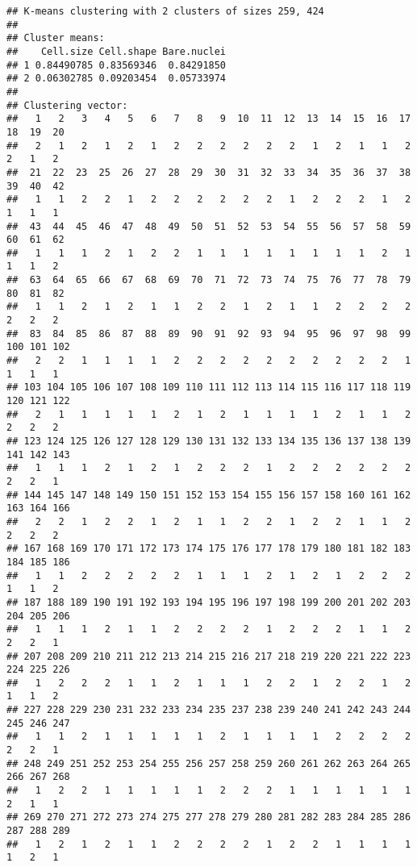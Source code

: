 \documentclass[]{article}
\begin{document}
\begin{verbatim}
## K-means clustering with 2 clusters of sizes 259, 424
## 
## Cluster means:
##    Cell.size Cell.shape Bare.nuclei
## 1 0.84490785 0.83569346  0.84291850
## 2 0.06302785 0.09203454  0.05733974
## 
## Clustering vector:
##   1   2   3   4   5   6   7   8   9  10  11  12  13  14  15  16  17  18  19  20 
##   2   1   2   1   2   1   2   2   2   2   2   2   1   2   1   1   2   2   1   2 
##  21  22  23  25  26  27  28  29  30  31  32  33  34  35  36  37  38  39  40  42 
##   1   1   2   2   1   2   2   2   2   2   2   1   2   2   2   1   2   1   1   1 
##  43  44  45  46  47  48  49  50  51  52  53  54  55  56  57  58  59  60  61  62 
##   1   1   1   2   1   2   2   1   1   1   1   1   1   1   1   2   1   1   1   2 
##  63  64  65  66  67  68  69  70  71  72  73  74  75  76  77  78  79  80  81  82 
##   1   1   2   1   2   1   1   2   2   1   2   1   1   2   2   2   2   2   2   2 
##  83  84  85  86  87  88  89  90  91  92  93  94  95  96  97  98  99 100 101 102 
##   2   2   1   1   1   1   2   2   2   2   2   2   2   2   2   2   1   1   1   1 
## 103 104 105 106 107 108 109 110 111 112 113 114 115 116 117 118 119 120 121 122 
##   2   1   1   1   1   1   2   1   2   1   1   1   1   2   1   1   2   2   2   2 
## 123 124 125 126 127 128 129 130 131 132 133 134 135 136 137 138 139 141 142 143 
##   1   1   1   2   1   2   1   2   2   2   1   2   2   2   2   2   2   2   2   1 
## 144 145 147 148 149 150 151 152 153 154 155 156 157 158 160 161 162 163 164 166 
##   2   2   1   2   2   1   2   1   1   2   2   1   2   2   1   1   2   2   2   2 
## 167 168 169 170 171 172 173 174 175 176 177 178 179 180 181 182 183 184 185 186 
##   1   1   2   2   2   2   2   1   1   1   2   1   2   1   2   2   2   1   1   2 
## 187 188 189 190 191 192 193 194 195 196 197 198 199 200 201 202 203 204 205 206 
##   1   1   1   2   1   1   2   2   2   2   1   2   2   2   1   1   2   2   2   1 
## 207 208 209 210 211 212 213 214 215 216 217 218 219 220 221 222 223 224 225 226 
##   1   2   2   2   1   1   2   1   1   1   2   2   1   2   2   1   2   1   1   2 
## 227 228 229 230 231 232 233 234 235 237 238 239 240 241 242 243 244 245 246 247 
##   1   1   2   1   1   1   1   1   2   1   1   1   1   2   2   2   2   2   2   1 
## 248 249 251 252 253 254 255 256 257 258 259 260 261 262 263 264 265 266 267 268 
##   1   2   2   1   1   1   1   1   2   2   2   1   1   1   1   1   1   2   1   1 
## 269 270 271 272 273 274 275 277 278 279 280 281 282 283 284 285 286 287 288 289 
##   1   2   1   2   1   1   2   2   2   2   1   2   2   1   1   1   1   1   2   1 

\end{verbatim}
\end{document}
